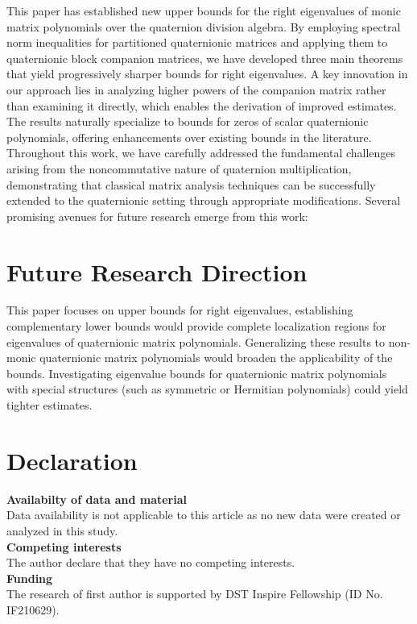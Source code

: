 \documentclass [12pt]{article}
\begin{document}
This paper has established new upper bounds for the right eigenvalues of monic matrix polynomials over the quaternion division algebra. By employing spectral norm inequalities for partitioned quaternionic matrices and applying them to quaternionic block companion matrices, we have developed three main theorems that yield progressively sharper bounds for right eigenvalues. A key innovation in our approach lies in analyzing higher powers of the companion matrix rather than examining it directly, which enables the derivation of improved estimates. The results naturally specialize to bounds for zeros of scalar quaternionic polynomials, offering enhancements over existing bounds in the literature. Throughout this work, we have carefully addressed the fundamental challenges arising from the noncommutative nature of quaternion multiplication, demonstrating that classical matrix analysis techniques can be successfully extended to the quaternionic setting through appropriate modifications.
Several promising avenues for future research emerge from this work:

\section{Future Research Direction} This paper focuses on upper bounds for right eigenvalues, establishing complementary lower bounds would provide complete localization regions for eigenvalues of quaternionic matrix polynomials. Generalizing these results to non-monic quaternionic matrix polynomials would broaden the applicability of the bounds. Investigating eigenvalue bounds for quaternionic matrix polynomials with special structures (such as symmetric or Hermitian polynomials) could yield tighter estimates.


\section{Declaration}
\textbf{Availabilty of data and material}\\
 Data availability is not applicable to this article as no new data were created or analyzed in this study.\\

\noindent \textbf{Competing interests}\\
The author declare that they have no competing interests.\\

\noindent \textbf{Funding}\\
The research of first author is supported by DST Inspire Fellowship (ID No. IF210629).
\end{document}
